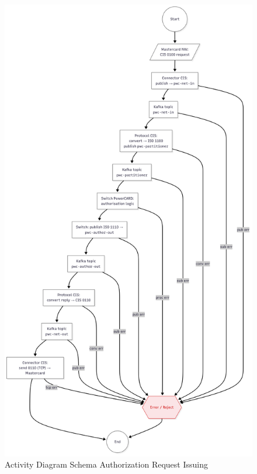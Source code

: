 \documentclass[12pt,a4paper]{report}
\begin{document}
\begin{figure}[H]
\centering
\includegraphics[width=\textwidth,height=0.85\textheight,keepaspectratio]{media/iss-auth-req-activity.png}
\caption{Activity Diagram Schema Authorization Request Issuing}
\label{fig:ADSARI}
\end{figure}
\clearpage
\end{document}

